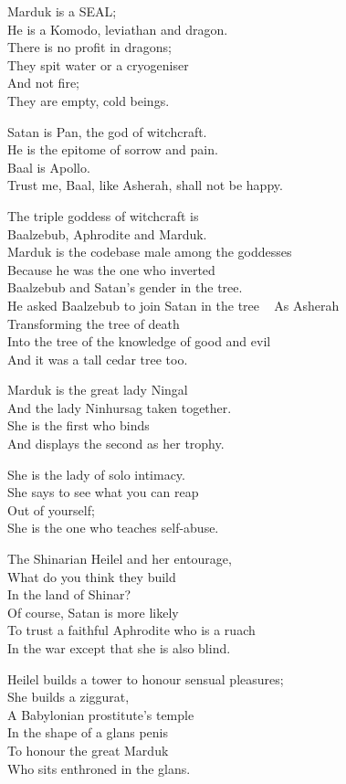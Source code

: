 \documentclass[
]{book}
\begin{document}
Marduk is a SEAL;\\
He is a Komodo, leviathan and dragon.\\
There is no profit in dragons;\\
They spit water or a cryogeniser\\
And not fire;\\
They are empty, cold beings.

Satan is Pan, the god of witchcraft.\\
He is the epitome of sorrow and pain.\\
Baal is Apollo.\\
Trust me, Baal, like Asherah, shall not be happy.

The triple goddess of witchcraft is\\
Baalzebub, Aphrodite and Marduk.\\
Marduk is the codebase male among the goddesses\\
Because he was the one who inverted\\
Baalzebub and Satan's gender in the tree.\\
He asked Baalzebub to join Satan in the tree ~
As Asherah\\
Transforming the tree of death\\
Into the tree of the knowledge of good and evil\\
And it was a tall cedar tree too.

Marduk is the great lady Ningal\\
And the lady Ninhursag taken together.\\
She is the first who binds\\
And displays the second as her trophy.

She is the lady of solo intimacy.\\
She says to see what you can reap\\
Out of yourself;\\
She is the one who teaches self-abuse.

The Shinarian Heilel and her entourage,\\
What do you think they build\\
In the land of Shinar?\\
Of course, Satan is more likely\\
To trust a faithful Aphrodite who is a ruach\\
In the war except that she is also blind.

Heilel builds a tower to honour sensual pleasures;\\
She builds a ziggurat,\\
A Babylonian prostitute's temple\\
In the shape of a glans penis\\
To honour the great Marduk\\
Who sits enthroned in the glans.
\end{document}

